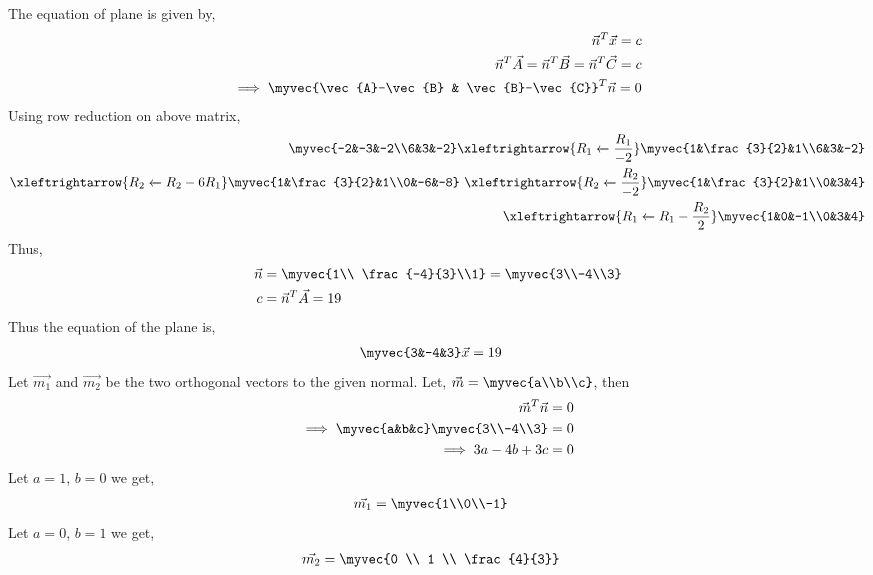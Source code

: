 The equation of plane is given by, 
\begin{align}
\vec{n}^T\vec{x} = c \\
\vec{n}^T\vec{A}=\vec{n}^T\vec{B}=\vec{n}^T\vec{C}=c \\
\implies \myvec{\vec{A}-\vec{B} & \vec{B}-\vec{C}}^T\vec{n}=0
\end{align}
Using row reduction on above matrix, 
\begin{align}
    \myvec{-2&-3&-2\\6&3&-2} \xleftrightarrow{R_1\xleftarrow{}\frac{R_1}{-2}}
    \myvec{1&\frac{3}{2}&1\\6&3&-2} \\
    \xleftrightarrow{R_2\xleftarrow{}R_2-6R_1} \myvec{1&\frac{3}{2}&1\\0&-6&-8}\
    \xleftrightarrow{R_2\xleftarrow{}\frac{R_2}{-2}}\myvec{1&\frac{3}{2}&1\\0&3&4}\\
    \xleftrightarrow{R_1\xleftarrow{}R_1-\frac{R_2}{2}} \myvec{1&0&-1\\0&3&4}
\end{align}
Thus, 
\begin{align}
    \vec{n}&=\myvec{1\\ \frac{-4}{3}\\1} = \myvec{3\\-4\\3} \\
    c&=\vec{n}^T\vec{A}=19
\end{align}
Thus the equation of the plane is, 
\begin{align}
    \myvec{3&-4&3}\vec{x}&=19
\end{align}
Let $\vec{m_1}$ and $\vec{m_2}$ be the two orthogonal vectors to the given normal.
Let, $\vec{m}=\myvec{a\\b\\c}$, then
\begin{align}
    \vec{m}^T\vec{n}&=0 \\
    \implies\myvec{a&b&c}\myvec{3\\-4\\3}&=0 \\
    \implies 3a-4b+3c&=0
\end{align}
Let $a=1$, $b=0$ we get,
\begin{align}
    \vec{m_1}&=\myvec{1\\0\\-1}
\end{align}
Let $a=0$, $b=1$ we get, 
\begin{align}
    \vec{m_2}&=\myvec{0 \\ 1 \\ \frac{4}{3}}
\end{align}
